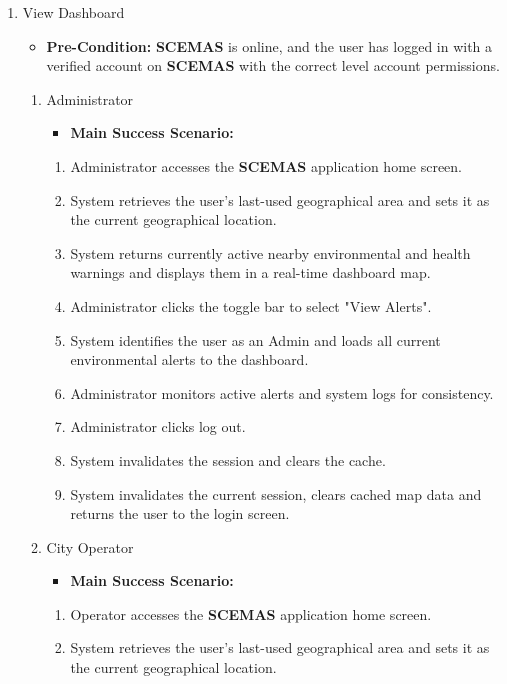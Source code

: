 \documentclass[]{article}
\begin{document}
\begin{enumerate}[{\bf BE1.}]
	\item View Dashboard
		\begin{itemize}
			\item[] {\bf Pre-Condition:} \textbf{SCEMAS} is online, and the user has logged in with a verified account on \textbf{SCEMAS} with the correct level account permissions.
		\end{itemize}
		\begin{enumerate}[{\bf VP1.}]
		\item Administrator
			\begin{itemize}
				\item[] {\bf Main Success Scenario:}
			\end{itemize}
			\begin{enumerate}[1.]
				\item Administrator accesses the \textbf{SCEMAS} application home screen.
				\item System retrieves the user's last-used geographical area and sets it as the current geographical location.
				\item System returns currently active nearby environmental and health warnings and displays them in a real-time dashboard map.
				\item Administrator clicks the toggle bar to select "View Alerts".
				\item System identifies the user as an Admin and loads all current environmental alerts to the dashboard.
				\item Administrator monitors active alerts and system logs for consistency.
				\item Administrator clicks log out.
				\item System invalidates the session and clears the cache.
				\item System invalidates the current session, clears cached map data and returns the user to the login screen.
			\end{enumerate}
		\item City Operator
			\begin{itemize}
				\item[] {\bf Main Success Scenario:}
			\end{itemize}
			\begin{enumerate}[1.]
				\item Operator accesses the \textbf{SCEMAS} application home screen.
				\item System retrieves the user's last-used geographical area and sets it as the current geographical location.

\end{enumerate}
\end{enumerate}
\end{enumerate}
\end{document}
